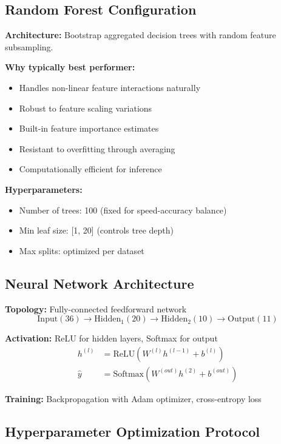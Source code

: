 \documentclass[11pt,a4paper]{article}
\begin{document}
\subsection{Random Forest Configuration}

\textbf{Architecture:} Bootstrap aggregated decision trees with random feature subsampling.

\textbf{Why typically best performer:}
\begin{itemize}[itemsep=0.3em]
    \item Handles non-linear feature interactions naturally
    \item Robust to feature scaling variations
    \item Built-in feature importance estimates
    \item Resistant to overfitting through averaging
    \item Computationally efficient for inference
\end{itemize}

\textbf{Hyperparameters:}
\begin{itemize}[itemsep=0.2em]
    \item Number of trees: 100 (fixed for speed-accuracy balance)
    \item Min leaf size: [1, 20] (controls tree depth)
    \item Max splits: optimized per dataset
\end{itemize}

\subsection{Neural Network Architecture}

\textbf{Topology:} Fully-connected feedforward network
\begin{equation}
\text{Input}(36) \to \text{Hidden}_1(20) \to \text{Hidden}_2(10) \to \text{Output}(11)
\end{equation}

\textbf{Activation:} ReLU for hidden layers, Softmax for output
\begin{align}
h^{(l)} &= \text{ReLU}(W^{(l)} h^{(l-1)} + b^{(l)}) \\
\hat{y} &= \text{Softmax}(W^{(out)} h^{(2)} + b^{(out)})
\end{align}

\textbf{Training:} Backpropagation with Adam optimizer, cross-entropy loss

\subsection{Hyperparameter Optimization Protocol}
\end{document}
